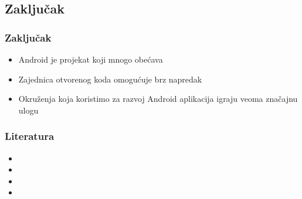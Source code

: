 \documentclass{beamer}
\begin{document}
\begin{frame}
    \section{Zaključak}
    \frametitle{Zaključak} 
    \begin{itemize}
	\item Android je projekat koji mnogo obećava
	\item Zajednica otvorenog koda omogućuje brz napredak
	\item Okruženja koja koristimo za razvoj Android aplikacija igraju veoma značajnu ulogu
	
   \end{itemize}
\end{frame}

\begin{frame}
    \frametitle{Literatura}
    \begin{itemize}
	\item
	\item 
	\item 
	\item  
   \end{itemize}
\end{frame}
\end{document}
